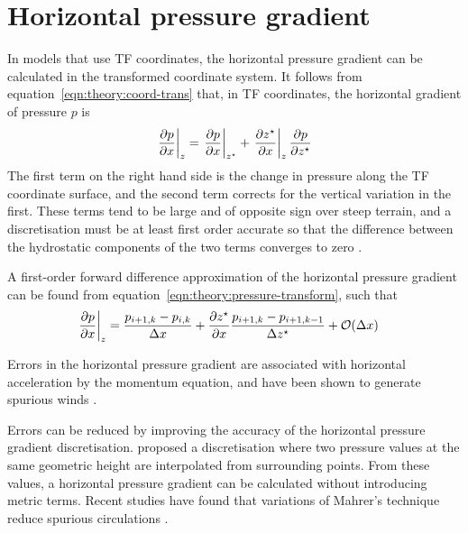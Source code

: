 \section{Horizontal pressure gradient}
In models that use TF coordinates, the horizontal pressure gradient can be calculated in the transformed coordinate system.  It follows from equation~\ref{eqn:theory:coord-trans} that, in TF coordinates, the horizontal gradient of pressure $p$ is \autocite{mahrer1984}
\begin{align}
	\left. \frac{\partial p}{\partial x} \right|_z = 
	\left. \frac{\partial p}{\partial x} \right|_{z^\star} + 
	\left. \frac{\partial {z^\star}}{\partial x} \right|_z
	\frac{\partial p}{\partial {z^\star}} \label{eqn:theory:pressure-transform}
\end{align}
The first term on the right hand side is the change in pressure along the TF coordinate surface, and the second term corrects for the vertical variation in the first.  These terms tend to be large and of opposite sign over steep terrain, and a discretisation must be at least first order accurate so that the difference between the hydrostatic components of the two terms converges to zero \autocite{gary1973}.

A first-order forward difference approximation of the horizontal pressure gradient can be found from equation~\ref{eqn:theory:pressure-transform}, such that
\begin{align}
	\left. \frac{\partial p}{\partial x} \right|_z &= \frac{p_{i+1,k} - p_{i,k}}{\Delta x} + \frac{\partial {z^\star}}{\partial x} \frac{p_{i+1,k} - p_{i+1,k-1}}{\Delta {z^\star}} + \mathcal{O}(\Delta x)
\end{align}

Errors in the horizontal pressure gradient are associated with horizontal acceleration by the momentum equation, and have been shown to generate spurious winds \parencites{klemp2003}{klemp2011}.

Errors can be reduced by improving the accuracy of the horizontal pressure gradient discretisation.  \textcite{mahrer1984} proposed a discretisation where two pressure values at the same geometric height are interpolated from surrounding points.  From these values, a horizontal pressure gradient can be calculated without introducing metric terms.  Recent studies have found that variations of Mahrer's technique reduce spurious circulations \parencites{dempsey-davis1998}{klemp2011}{zaengl2012}.  
